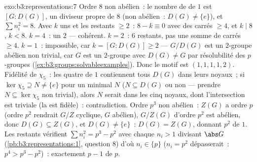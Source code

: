 \begin{solution}{exo:b3:representations:7}
Ordre $8$ non abélien~: le nombre de  de  $1$ est
$[G : D(G)]$, un diviseur propre de $8$ (non abélien~: $D(G)
\neq \{e\}$), et $\sum n_i^2 = 8$. Avec $k$ uns et les 
restants $\geq 2$~: $8 - k \equiv 0$ avec des carrés $\geq 4$,
et $k \mid 8$, $k < 8$. $k = 4$~: un  $2$ --- cohérent. $k
= 2$~: $6$ restants, pas une somme de carrés $\geq 4$. $k =
1$~: impossible, car $k = [G : D(G)] \geq 2$ --- $G/D(G)$ est
un $2$-groupe abélien non trivial, car $G$ est un $2$-groupe
avec $D(G) \neq G$ par résolubilité des $p$-groupes
(\cref{ex:b3:groups:solvableexamples}). Donc le motif est
$(1,1,1,1,2)$. Fidélité de $\chi_5$~: les quatre  de
 $1$ contiennent tous $D(G)$ dans leurs noyaux~; si
$\ker\chi_5 \supseteq N \neq \{e\}$ pour un  minimal $N$
($N \subseteq D(G)$ ou non --- prendre $N \subseteq \ker\chi_5$
non trivial), alors $N$ serait dans les cinq noyaux, dont
l'intersection est triviale (la  est
fidèle)~: contradiction. Ordre $p^3$ non abélien~: $Z(G)$ a
ordre $p$ (ordre $p^2$ rendrait $G/Z$ cyclique, $G$ abélien),
$G/Z(G)$ d'ordre $p^2$ est abélien, donc $D(G) \subseteq Z(G)$,
et $D(G) \ne \{e\}$~: $D(G) = Z(G)$, donnant $p^2$ 
de  $1$. Les  restants vérifient $\sum n_i^2 = p^3 -
p^2$ avec chaque $n_i > 1$ divisant $\abs G$
(\cref{pb:b3:representations:1}, question 8) d'où $n_i \in
\{p\}$ ($n_i = p^2$ dépasserait~: $p^4 > p^3 - p^2$)~: exactement
$p - 1$  de  $p$.
\end{solution}

